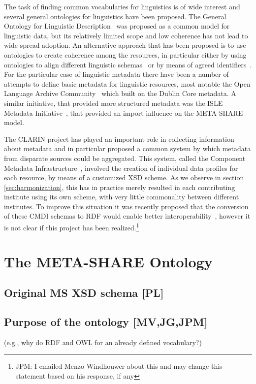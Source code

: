 \documentclass{llncs}
\begin{document}
The task of finding common vocabularies for linguistics is of wide interest and
several general ontologies for linguistics have been proposed. The General
Ontology for Linguistic Description~\cite[GOLD]{farrar2002common} was proposed
as a common model for linguistic data, but its relatively limited scope and low
coherence has not lead to wide-spread adoption. An alternative approach that has
been proposed is to use ontologies to create coherence among the resources, in
particular either by using ontologies to align different linguistic
schemas~\cite{chiarcos2012ontologies} or by means of agreed
identifiers~\cite{kemps2008isocat}. For the particular case of linguistic
metadata there have been a number of attempts to define basic metadata for
linguistic resources, most notable the Open Language Archive
Community~\cite[OLAC]{bird2001olac} which built on the Dublin Core metadata. A
similar initiative, that provided more structured metadata was the ISLE Metadata
Initiative~\cite[IMDI]{broeder2001imdi}, that provided an import influence on
the META-SHARE model.

The CLARIN project has played an important role in collecting information about
metadata and in particular proposed a common system by which metadata from
disparate sources could be aggregated. This system, called the Component
Metadata Infrastructure~\cite{broeder2012cmdi}, involved the creation of
individual data profiles for each resource, by means of a customized XSD scheme.
As we observe in section \ref{sec:harmonization}, this has in practice merely
resulted in each contributing institute using its own scheme, with very little
commonality between different institutes. To improve this situation it was
recently proposed that the conversion of these CMDI schemas to RDF would enable
better interoperability~\cite{durco2014clarin}, however it is not clear if this
project has been realized.\footnote{JPM: I emailed Menzo Windhouwer about this
and may change this statement based on his response, if any}

\section{The META-SHARE Ontology}
\label{sec:ontology}

\subsection{Original MS XSD schema [PL]}
\label{sec:xsd}

\subsection{Purpose of the ontology [MV,JG,JPM]}
\label{sec:purpose}
(e.g., why do RDF and OWL for an already defined vocabulary?) 
\end{document}

